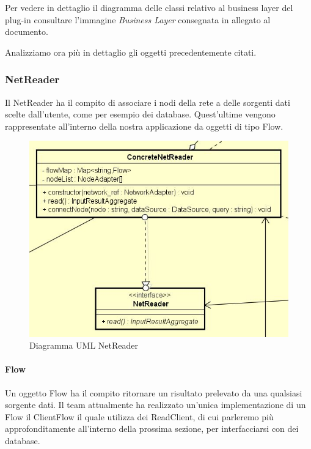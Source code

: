 Per vedere in dettaglio il diagramma delle classi relativo al business layer del plug-in consultare l'immagine \emph{Business Layer} consegnata in allegato al documento.
 
Analizziamo ora più in dettaglio gli oggetti precedentemente citati.
\subsubsection{NetReader}
Il NetReader ha il compito di associare i nodi della rete a delle sorgenti dati scelte dall'utente, come per esempio dei database. Quest'ultime vengono rappresentate all'interno della nostra applicazione da oggetti di tipo Flow.
\begin{figure} [H]
	\centering
		\includegraphics[scale=0.8]{Img/NetReader}
	\caption{Diagramma UML NetReader}\label{}
\end{figure}
\paragraph{Flow}\Spazio
Un oggetto Flow ha il compito ritornare un risultato prelevato da una qualsiasi sorgente dati.
Il team attualmente ha realizzato un'unica implementazione di un Flow il ClientFlow il quale utilizza dei ReadClient, di cui parleremo più approfonditamente all'interno della prossima sezione, per interfacciarsi con dei database.
